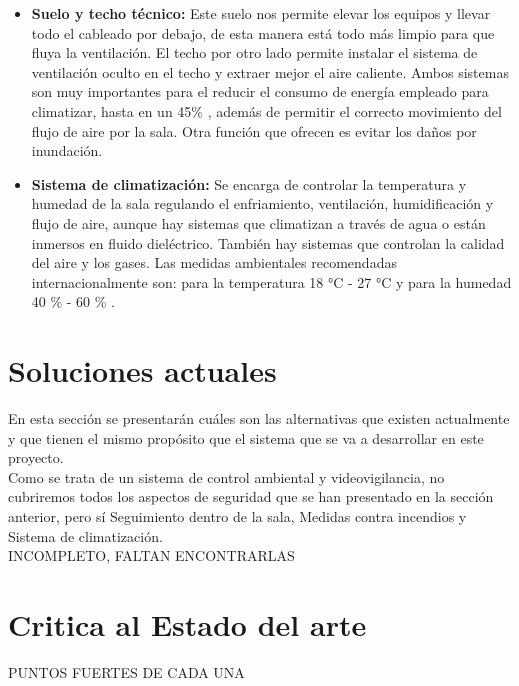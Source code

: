 \begin{itemize}
	\item \textbf{Suelo y techo técnico:} Este suelo nos permite elevar los equipos y llevar todo el cableado por debajo, de esta manera está todo más limpio para que fluya la ventilación. El techo por otro lado permite instalar el sistema de ventilación oculto en el techo y extraer mejor el aire caliente. Ambos sistemas son muy importantes para el reducir el consumo de energía empleado para climatizar, hasta en un 45\% \cite{noauthor_suelo_2020}, además de permitir el correcto movimiento del flujo de aire por la sala. Otra función que ofrecen es evitar los daños por inundación.
	\item \textbf{Sistema de climatización:} Se encarga de controlar la temperatura y humedad de la sala regulando el enfriamiento, ventilación, humidificación y flujo de aire, aunque hay sistemas que climatizan a través de agua o están inmersos en fluido dieléctrico. También hay sistemas que controlan la calidad del aire y los gases. Las medidas ambientales recomendadas internacionalmente son: para la temperatura 18 °C - 27 °C y para la humedad 40 \% - 60 \% \cite{noauthor_recommended_nodate}.
\end{itemize}

\section{Soluciones actuales}
En esta sección se presentarán cuáles son las alternativas que existen actualmente y que tienen el mismo propósito que el sistema que se va a desarrollar en este proyecto. \\ Como se trata de un sistema de control ambiental y videovigilancia, no cubriremos todos los aspectos de seguridad que se han presentado en la sección anterior, pero sí Seguimiento dentro de la sala, Medidas contra incendios y Sistema de climatización. \\ INCOMPLETO, FALTAN ENCONTRARLAS

\section{Critica al Estado del arte}
PUNTOS FUERTES DE CADA UNA

